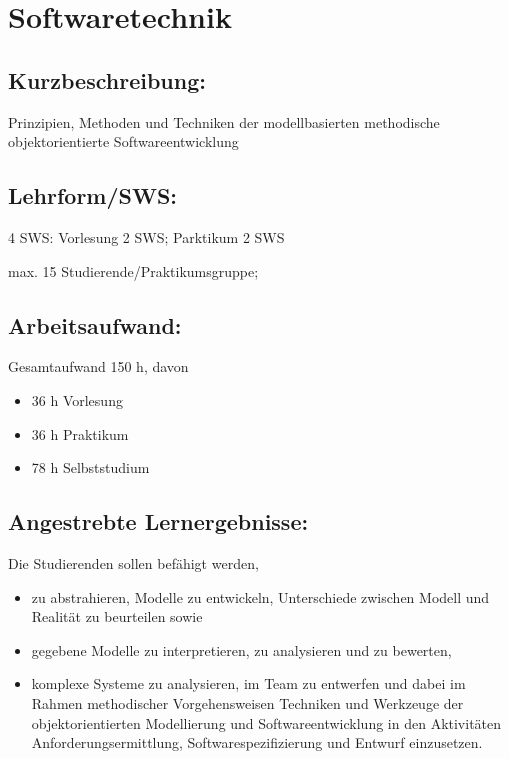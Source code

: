 \chapter{Softwaretechnik}\label{softwaretechnik}

\section*{Kurzbeschreibung:}\label{kurzbeschreibung-3}

Prinzipien, Methoden und Techniken der modellbasierten methodische
objektorientierte Softwareentwicklung

\section*{Lehrform/SWS:}\label{lehrformsws-22}

4 SWS: Vorlesung 2 SWS; Parktikum 2 SWS

max. 15 Studierende/Praktikumsgruppe;

\section*{Arbeitsaufwand:}\label{arbeitsaufwand-18}

Gesamtaufwand 150 h, davon

\begin{itemize}
\item
  36 h Vorlesung
\item
  36 h Praktikum
\item
  78 h Selbststudium
\end{itemize}

\section*{Angestrebte
Lernergebnisse:}\label{angestrebte-lernergebnisse-26}

Die Studierenden sollen befähigt werden,

\begin{itemize}
\item
  zu abstrahieren, Modelle zu entwickeln, Unterschiede zwischen Modell
  und Realität zu beurteilen sowie
\item
  gegebene Modelle zu interpretieren, zu analysieren und zu bewerten,
\item
  komplexe Systeme zu analysieren, im Team zu entwerfen und dabei im
  Rahmen methodischer Vorgehensweisen Techniken und Werkzeuge der
  objektorientierten Modellierung und Softwareentwicklung in den
  Aktivitäten Anforderungsermittlung, Softwarespezifizierung und Entwurf
  einzusetzen.
\end{itemize}

